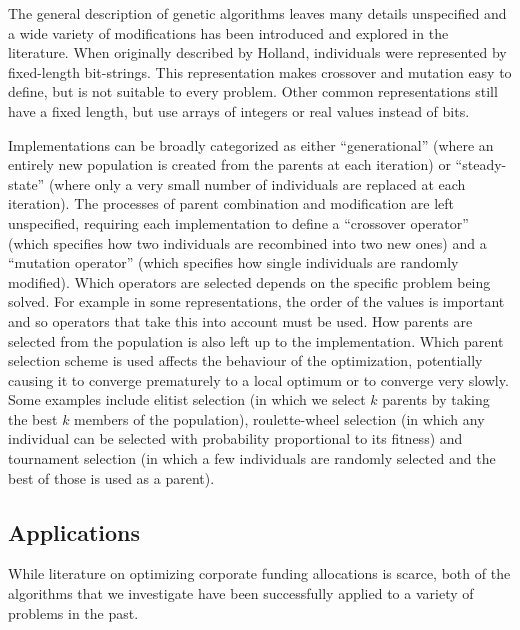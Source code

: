 \documentclass{sig-alternate}
\begin{document}
The general description of genetic algorithms leaves many details unspecified and a wide variety of modifications has been introduced and explored in the literature. When originally described by Holland, individuals were represented by fixed-length bit-strings. This representation makes crossover and mutation easy to define, but is not suitable to every problem. Other common representations still have a fixed length, but use arrays of integers or real values instead of bits\cite{Potvin1996}\cite{Cheng1996}\cite{Srinivas1994}.

Implementations can be broadly categorized as either ``generational'' (where an entirely new population is created from the parents at each iteration) or ``steady-state'' (where only a very small number of individuals are replaced at each iteration). The processes of parent combination and modification are left unspecified, requiring each implementation to define a ``crossover operator'' (which specifies how two individuals are recombined into two new ones) and a ``mutation operator'' (which specifies how single individuals are randomly modified). Which operators are selected depends on the specific problem being solved. For example in some representations, the order of the values is important and so operators that take this into account must be used.
How parents are selected from the population is also left up to the implementation. Which parent selection scheme is used affects the behaviour of the optimization, potentially causing it to converge prematurely to a local optimum or to converge very slowly. Some examples include elitist selection (in which we select $k$ parents by taking the best $k$ members of the population), roulette-wheel selection (in which any individual can be selected with probability proportional to its fitness) and tournament selection (in which a few individuals are randomly selected and the best of those is used as a parent).

\subsection{Applications}\label{sec:relatedwork}
While literature on optimizing corporate funding allocations is scarce, both of the algorithms that we investigate have been successfully applied to a variety of problems in the past.
\end{document}
